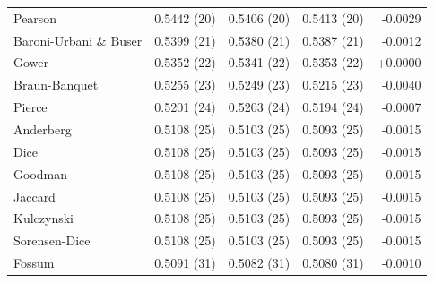 \begin{table}[t]
{\begin{tabular}{lrrrr}
Pearson & 0.5442 (20) & 0.5406 (20) & 0.5413 (20) & -0.0029 \\
Baroni-Urbani \& Buser & 0.5399 (21) & 0.5380 (21) & 0.5387 (21) & -0.0012 \\
Gower & 0.5352 (22) & 0.5341 (22) & 0.5353 (22) & +0.0000 \\
Braun-Banquet & 0.5255 (23) & 0.5249 (23) & 0.5215 (23) & -0.0040 \\
Pierce & 0.5201 (24) & 0.5203 (24) & 0.5194 (24) & -0.0007 \\
Anderberg & 0.5108 (25) & 0.5103 (25) & 0.5093 (25) & -0.0015 \\
Dice & 0.5108 (25) & 0.5103 (25) & 0.5093 (25) & -0.0015 \\
Goodman & 0.5108 (25) & 0.5103 (25) & 0.5093 (25) & -0.0015 \\
Jaccard & 0.5108 (25) & 0.5103 (25) & 0.5093 (25) & -0.0015 \\
Kulczynski & 0.5108 (25) & 0.5103 (25) & 0.5093 (25) & -0.0015 \\
Sorensen-Dice & 0.5108 (25) & 0.5103 (25) & 0.5093 (25) & -0.0015 \\
Fossum & 0.5091 (31) & 0.5082 (31) & 0.5080 (31) & -0.0010 \\
\bottomrule
\end{tabular}
}
\end{table}
